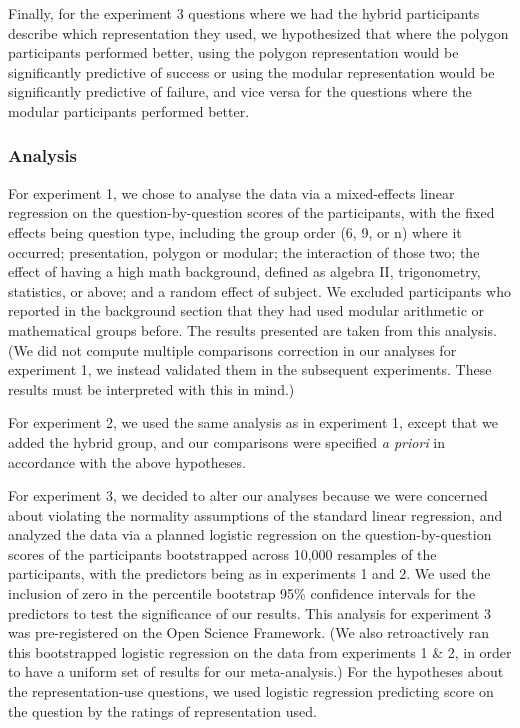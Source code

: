 \documentclass[man,10pt]{apa6}
\begin{document}
Finally, for the experiment 3 questions where we had the hybrid participants describe which representation they used, we hypothesized that where the polygon participants performed better, using the polygon representation would be significantly predictive of success or using the modular representation would be significantly predictive of failure, and vice versa for the questions where the modular participants performed better.
\subsubsection{Analysis}
For experiment 1, we chose to analyse the data via a mixed-effects linear regression on the question-by-question scores of the participants, with the fixed effects being question type, including the group order (6, 9, or n) where it occurred; presentation, polygon or modular; the interaction of those two; the effect of having a high math background, defined as algebra II, trigonometry, statistics, or above; and a random effect of subject. We excluded participants who reported in the background section that they had used modular arithmetic or mathematical groups before. The results presented are taken from this analysis. (We did not compute multiple comparisons correction in our analyses for experiment 1, we instead validated them in the subsequent experiments. These results must be interpreted with this in mind.) \par 
For experiment 2, we used the same analysis as in experiment 1, except that we added the hybrid group, and our comparisons were specified \textit{a priori} in accordance with the above hypotheses.\par
For experiment 3, we decided to alter our analyses because we were concerned about violating the normality assumptions of the standard linear regression, and analyzed the data via a planned logistic regression on the question-by-question scores of the participants bootstrapped across 10,000 resamples of the participants, with the predictors being as in experiments 1 and 2. We used the inclusion of zero in the percentile bootstrap 95\% confidence intervals for the predictors to test the significance of our results. This analysis for experiment 3 was pre-registered on the Open Science Framework.
(We also retroactively ran this bootstrapped logistic regression on the data from experiments 1 \& 2, in order to have a uniform set of results for our meta-analysis.) For the hypotheses about the representation-use questions, we used logistic regression predicting score on the question by the ratings of representation used.
\end{document}
